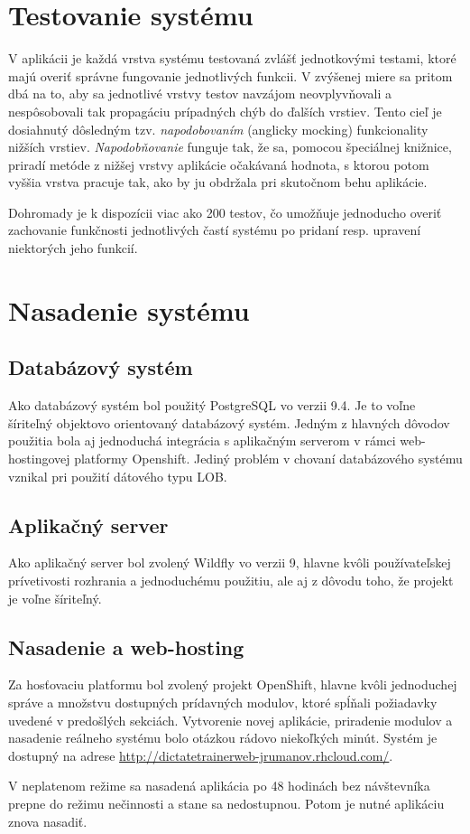 \documentclass[12pt,oneside]{fithesis2}
\begin{document}
    \chapter{Testovanie systému} \label{unit-testy}
	\par V aplikácii je každá vrstva systému testovaná zvlášť jednotkovými testami, ktoré majú overiť správne fungovanie jednotlivých funkcii. V zvýšenej miere sa pritom dbá na to, aby sa jednotlivé vrstvy testov navzájom neovplyvňovali a nespôsobovali tak propagáciu prípadných chýb do ďalších vrstiev. Tento cieľ je dosiahnutý dôsledným tzv. \textit{napodobovaním} (anglicky mocking) funkcionality nižších vrstiev. \textit{Napodobňovanie} funguje tak, že sa, pomocou špeciálnej knižnice, priradí metóde z nižšej vrstvy aplikácie očakávaná hodnota, s ktorou potom vyššia vrstva pracuje tak, ako by ju obdržala pri skutočnom behu aplikácie.
	\par Dohromady je k dispozícii viac ako 200 testov, čo umožňuje jednoducho overiť zachovanie funkčnosti jednotlivých častí systému po pridaní resp. upravení niektorých jeho funkcií.
    \chapter{Nasadenie systému} \label{nasadenie}
      \section{Databázový systém}
      \par Ako databázový systém bol použitý PostgreSQL vo verzii 9.4. Je to voľne šíriteľný objektovo orientovaný databázový systém\cite{postgre15}. Jedným z hlavných dôvodov použitia bola aj jednoduchá integrácia s aplikačným serverom v rámci web-hostingovej platformy Openshift. Jediný problém v chovaní databázového systému vznikal pri použití dátového typu LOB.
      \section{Aplikačný server}
      \par Ako aplikačný server bol zvolený Wildfly vo verzii 9, hlavne kvôli používateľskej prívetivosti rozhrania a jednoduchému použitiu, ale aj z dôvodu toho, že projekt je voľne šíriteľný.
      \section{Nasadenie a web-hosting}
      \par Za hosťovaciu platformu bol zvolený projekt OpenShift, hlavne kvôli jednoduchej správe a množstvu dostupných prídavných modulov, ktoré spĺňali požiadavky uvedené v predošlých sekciách. Vytvorenie novej aplikácie, priradenie modulov a nasadenie reálneho systému bolo otázkou rádovo niekoľkých minút. Systém je dostupný na adrese \url{http://dictatetrainerweb-jrumanov.rhcloud.com/}.
      \par V neplatenom režime sa nasadená aplikácia po 48 hodinách bez návštevníka prepne do režimu nečinnosti a stane sa nedostupnou.  Potom je nutné aplikáciu znova nasadiť.
\end{document}
